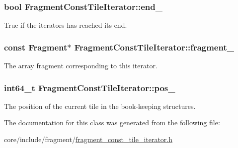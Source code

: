\subsubsection[{end\+\_\+}]{\setlength{\rightskip}{0pt plus 5cm}bool Fragment\+Const\+Tile\+Iterator\+::end\+\_\+\hspace{0.3cm}{\ttfamily [private]}}\label{classFragmentConstTileIterator_adadeb9e214fd8d5d21e7124c4b77bd27}
True if the iterators has reached its end. \hypertarget{classFragmentConstTileIterator_a037c2611dede11d9d3ad7110340e91d8}{}
\subsubsection[{fragment\+\_\+}]{\setlength{\rightskip}{0pt plus 5cm}const {\bf Fragment}$\ast$ Fragment\+Const\+Tile\+Iterator\+::fragment\+\_\+\hspace{0.3cm}{\ttfamily [private]}}\label{classFragmentConstTileIterator_a037c2611dede11d9d3ad7110340e91d8}
The array fragment corresponding to this iterator. \hypertarget{classFragmentConstTileIterator_a11d875ee32e9d9cbdaf784534134eaf2}{}
\subsubsection[{pos\+\_\+}]{\setlength{\rightskip}{0pt plus 5cm}int64\+\_\+t Fragment\+Const\+Tile\+Iterator\+::pos\+\_\+\hspace{0.3cm}{\ttfamily [private]}}\label{classFragmentConstTileIterator_a11d875ee32e9d9cbdaf784534134eaf2}
The position of the current tile in the book-\/keeping structures. 

The documentation for this class was generated from the following file\+:\begin{DoxyCompactItemize}
\item 
core/include/fragment/\hyperlink{fragment__const__tile__iterator_8h}{fragment\+\_\+const\+\_\+tile\+\_\+iterator.\+h}\end{DoxyCompactItemize}
